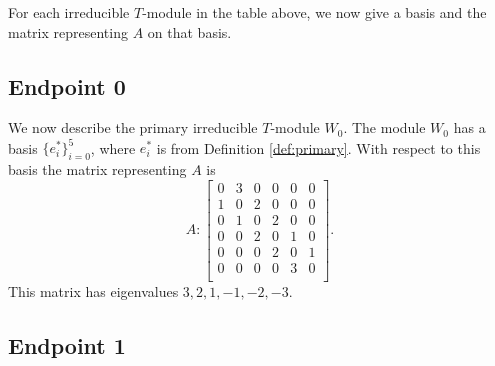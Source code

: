 \documentclass[12pt,letterpaper]{article}
\begin{document}
\begin{center}
\smallskip
{}
\end{center}


For each irreducible $T$-module in the table above, we now give a basis and the matrix representing $A$ on that basis. 

\subsection{Endpoint 0}

We now describe the primary irreducible $T$-module $W_0$. The module $W_0$ has a basis $\{e_i^*\}_{i=0}^5$, where $e_i^*$ is from Definition \ref{def:primary}. With respect to this basis the matrix representing $A$ is
\begin{equation}
    A: \begin{bmatrix}
0 & 3 & 0 & 0 & 0 & 0 \\
1 & 0 & 2 & 0 & 0 & 0 \\
0 & 1 & 0 & 2 & 0 & 0 \\
0 & 0 & 2 & 0 & 1 & 0 \\
0 & 0 & 0 & 2 & 0 & 1 \\
0 & 0 & 0 & 0 & 3 & 0 \\
\end{bmatrix}.
\label{eq:des-I}
\end{equation}
This matrix has eigenvalues $3, 2, 1, -1, -2, -3$.

\subsection{Endpoint 1}
\end{document}
